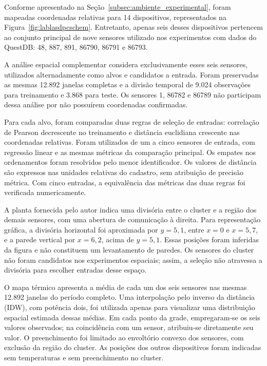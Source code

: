 Conforme apresentado na Seção~\ref{subsec:ambiente_experimental}, foram mapeadas coordenadas relativas para 14 dispositivos, representados na Figura~\ref{fig:lablasdpcschem}. Entretanto, apenas seis desses dispositivos pertencem ao conjunto principal de nove sensores utilizado nos experimentos com dados do QuestDB: 48, 887, 891, 86790, 86791 e 86793.

A análise espacial complementar considera exclusivamente esses seis sensores, utilizados alternadamente como alvos e candidatos a entrada. Foram preservadas as mesmas 12.892 janelas completas e a divisão temporal de 9.024 observações para treinamento e 3.868 para teste. Os sensores 1, 86782 e 86789 não participam dessa análise por não possuírem coordenadas confirmadas.

Para cada alvo, foram comparadas duas regras de seleção de entradas:
correlação de Pearson decrescente no treinamento e distância euclidiana
crescente nas coordenadas relativas. Foram utilizados de um a cinco
sensores de entrada, com regressão linear e as mesmas métricas da
comparação principal. Os empates nos ordenamentos foram resolvidos
pelo menor identificador. Os valores de distância são expressos nas
unidades relativas do cadastro, sem atribuição de precisão métrica.
Com cinco entradas, a equivalência das métricas das duas regras foi
verificada numericamente.

A planta fornecida pelo autor indica uma divisória entre o cluster
e a região dos demais sensores, com uma abertura de comunicação à
direita. Para representação gráfica, a divisória horizontal foi
aproximada por $y=5{,}1$, entre $x=0$ e $x=5{,}7$, e a parede vertical
por $x=6{,}2$, acima de $y=5{,}1$. Essas posições foram inferidas da
figura e não constituem um levantamento de paredes. Os sensores do
cluster não foram candidatos nos experimentos espaciais; assim, a
seleção não atravessa a divisória para escolher entradas desse espaço.

O mapa térmico apresenta a média de cada um dos seis sensores nas
mesmas 12.892 janelas do período completo. Uma interpolação pelo
inverso da distância (IDW), com potência dois, foi utilizada apenas
para visualizar uma distribuição espacial estimada dessas médias.
Em cada ponto da grade, empregaram-se os seis valores observados;
na coincidência com um sensor, atribuiu-se diretamente seu valor.
O preenchimento foi limitado ao envoltório convexo dos sensores,
com exclusão da região do cluster. As posições dos outros dispositivos
foram indicadas sem temperaturas e sem preenchimento no cluster.


